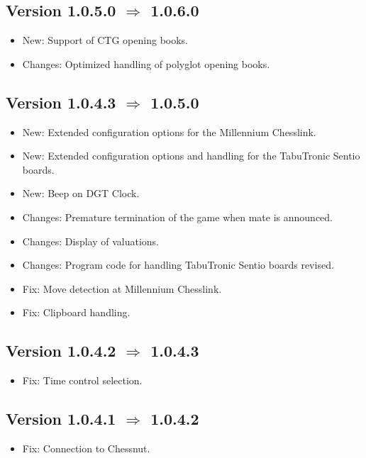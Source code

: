 \documentclass[11pt,a4paper]{article}
\begin{document}
\subsection*{Version 1.0.5.0 $\Rightarrow$  1.0.6.0}
\begin{itemize}			
	\item {\color{blue}New}: Support of CTG opening books.
	\item {\color{teal}Changes}: Optimized handling of polyglot opening books.
\end{itemize}

\subsection*{Version 1.0.4.3 $\Rightarrow$  1.0.5.0}
\begin{itemize}		
	\item {\color{blue}New}: Extended configuration options for the Millennium Chesslink.
	\item {\color{blue}New}: Extended configuration options and handling for the TabuTronic Sentio boards.
	\item {\color{blue}New}: Beep on DGT Clock.
	\item {\color{teal}Changes}: Premature termination of the game when mate is announced.
    \item {\color{teal}Changes}: Display of valuations.
    \item {\color{teal}Changes}: Program code for handling TabuTronic Sentio boards revised.
    \item {\color{red}Fix}: Move detection at Millennium Chesslink.
	\item {\color{red}Fix}: Clipboard handling.
\end{itemize}

\subsection*{Version 1.0.4.2 $\Rightarrow$  1.0.4.3}
\begin{itemize}		
	\item {\color{red}Fix}: Time control selection.
\end{itemize}


\subsection*{Version 1.0.4.1 $\Rightarrow$  1.0.4.2}
\begin{itemize}		
	\item {\color{red}Fix}: Connection to Chessnut.	
\end{itemize}
\end{document}
